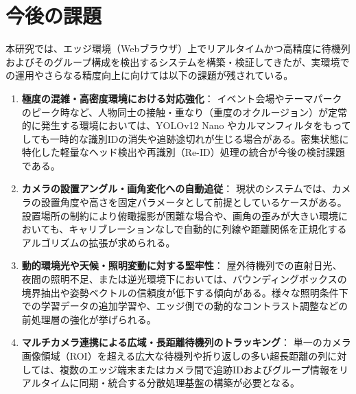 \section{今後の課題}

本研究では、エッジ環境（Webブラウザ）上でリアルタイムかつ高精度に待機列およびそのグループ構成を検出するシステムを構築・検証してきたが、実環境での運用やさらなる精度向上に向けては以下の課題が残されている。

\begin{enumerate}
    \item \textbf{極度の混雑・高密度環境における対応強化}：
    イベント会場やテーマパークのピーク時など、人物同士の接触・重なり（重度のオクルージョン）が定常的に発生する環境においては、YOLOv12 Nano やカルマンフィルタをもってしても一時的な識別IDの消失や追跡途切れが生じる場合がある。密集状態に特化した軽量なヘッド検出や再識別（Re-ID）処理の統合が今後の検討課題である。

    \item \textbf{カメラの設置アングル・画角変化への自動追従}：
    現状のシステムでは、カメラの設置角度や高さを固定パラメータとして前提としているケースがある。設置場所の制約により俯瞰撮影が困難な場合や、画角の歪みが大きい環境においても、キャリブレーションなしで自動的に列線や距離関係を正規化するアルゴリズムの拡張が求められる。

    \item \textbf{動的環境光や天候・照明変動に対する堅牢性}：
    屋外待機列での直射日光、夜間の照明不足、または逆光環境下においては、バウンディングボックスの境界抽出や姿勢ベクトルの信頼度が低下する傾向がある。様々な照明条件下での学習データの追加学習や、エッジ側での動的なコントラスト調整などの前処理層の強化が挙げられる。

    \item \textbf{マルチカメラ連携による広域・長距離待機列のトラッキング}：
    単一のカメラ画像領域（ROI）を超える広大な待機列や折り返しの多い超長距離の列に対しては、複数のエッジ端末またはカメラ間で追跡IDおよびグループ情報をリアルタイムに同期・統合する分散処理基盤の構築が必要となる。
\end{enumerate}
